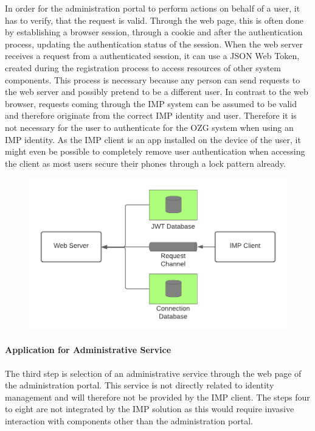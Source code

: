 \documentclass[
     12pt,         %
     a4paper,      %
     BCOR=10mm,version=first,     %
     DIV=14,version=first,        %
     ]{scrreprt}
\begin{document}
In order for the administration portal to perform actions on behalf of a user, it has to verify, that the request is valid. Through the web page, this is often done by establishing a browser session, through a cookie and after the authentication process, updating the authentication status of the session. When the web server receives a request from a authenticated session, it can use a JSON Web Token, created during the registration process to access resources of other system components. This process is necessary because any person can send requests to the web server and possibly pretend to be a different user. In contrast to the web browser, requests coming through the IMP system can be assumed to be valid and therefore originate from the correct IMP identity and user. Therefore it is not necessary for the user to authenticate for the OZG system when using an IMP identity. As the IMP client is an app installed on the device of the user, it might even be possible to completely remove user authentication when accessing the client as most users secure their phones through a lock pattern already.

\begin{figure}[h]
    \centering
    \includegraphics[scale=0.3]{Diagrams/Integration Architecture 1/Overview/Login.png}
\end{figure}

\paragraph{Application for Administrative Service}
The third step is selection of an administrative service through the web page of the administration portal. This service is not directly related to identity management and will therefore not be provided by the IMP client.
The steps four to eight are not integrated by the IMP solution as this would require invasive interaction with components other than the administration portal.
\end{document}
